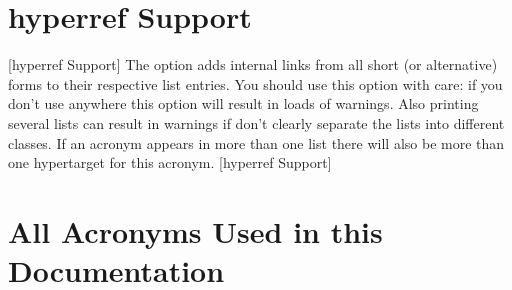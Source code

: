 \documentclass[DIV10,toc=index,toc=bib]{cnpkgdoc}
\begin{document}
\section{hyperref Support}[hyperref Support]
The option  adds internal links from all short (or alternative)
forms to their respective list entries. You should use this option with care: if
you don't use  anywhere this option will result in loads of
 warnings. Also printing several lists can result in warnings
if don't clearly separate the lists into different classes. If an acronym appears
in more than one list there will also be more than one hypertarget for this
acronym.
[hyperref Support]

\appendix
\section{All Acronyms Used in this Documentation}\label{sec:documentation_acronyms}
\begin{beispiel}
 \printacronyms
\end{beispiel}
\printacronyms

\begin{beispiel}
\end{beispiel}

{\RaggedRight
\printbibliography}

\printindex
\end{document}
